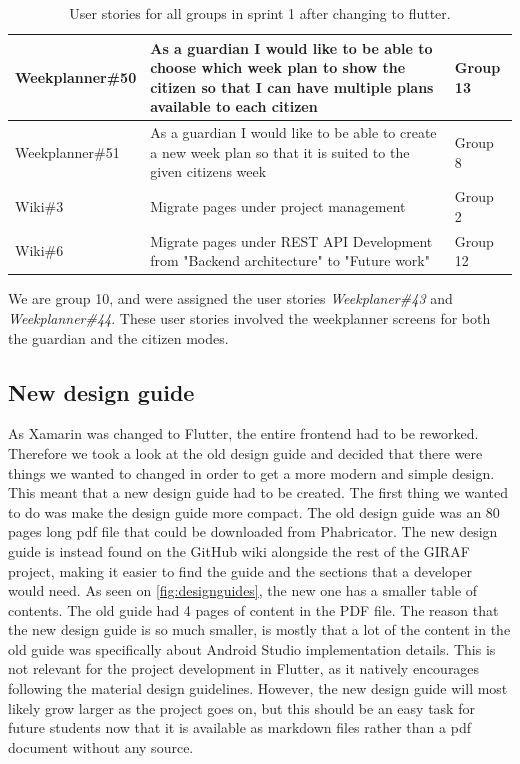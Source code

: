 \begin{table}[H]
\begin{tabular}{|p{2.8cm}|p{8cm}|p{1.6cm}|}
    Weekplanner\#50 & As a guardian I would like to be able to choose which week plan to show the citizen so that I can have multiple plans available to each citizen & Group 13             \\ \hline
    Weekplanner\#51 & As a guardian I would like to be able to create a new week plan so that it is suited to the given citizens week & Group 8             \\ \hline
    Wiki\#3         & Migrate pages under project management                                                                                                                                   & Group 2              \\ \hline
    Wiki\#6         & Migrate pages under REST API Development from "Backend architecture" to "Future work"                                                                                    & Group 12             \\ \hline
    \end{tabular}
    \caption{User stories for all groups in sprint 1 after changing to flutter.}\label{table:user-stories-sprint-1}
\end{table}
\noindent
We are group 10, and were assigned the user stories \textit{Weekplaner\#43} and \textit{Weekplanner\#44}.
These user stories involved the weekplanner screens for both the guardian and the citizen modes.

\subsection{New design guide}
As Xamarin was changed to Flutter, the entire frontend had to be reworked. 
Therefore we took a look at the old design guide and decided that there were things we wanted to changed in order to get a more modern and simple design.
This meant that a new design guide had to be created.
The first thing we wanted to do was make the design guide more compact.
The old design guide was an 80 pages long pdf file that could be downloaded from Phabricator.
The new design guide is instead found on the GitHub wiki alongside the rest of the GIRAF project, making it easier to find the guide and the sections that a developer would need.
As seen on \autoref{fig:designguides}, the new one has a smaller table of contents.
The old guide had 4 pages of content in the PDF file.
The reason that the new design guide is so much smaller, is mostly that a lot of the content in the old guide was specifically about Android Studio implementation details.
This is not relevant for the project development in Flutter, as it natively encourages following the material design guidelines.
However, the new design guide will most likely grow larger as the project goes on, but this should be an easy task for future students now that it is available as markdown files rather than a pdf document without any source. 

